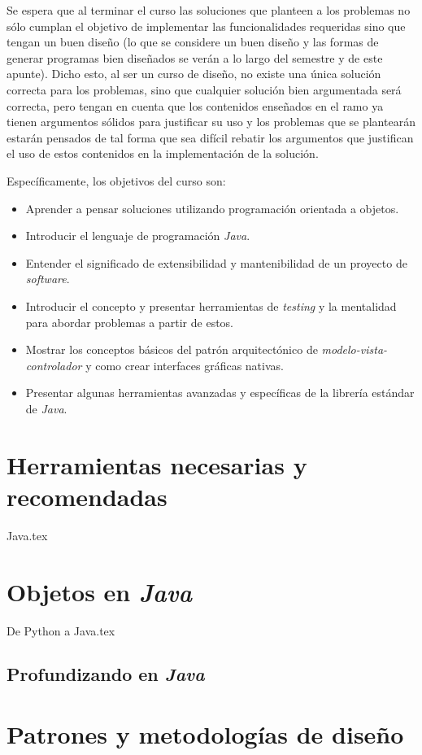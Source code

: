 \documentclass[12pt]{book}
\theoremstyle{definition}
\begin{document}
      Se espera que al terminar el curso las soluciones que planteen a los problemas no
      sólo cumplan el objetivo de implementar las funcionalidades requeridas sino que 
      tengan un buen diseño (lo que se considere un buen diseño y las formas de generar 
      programas bien diseñados se verán a lo largo del semestre y de este apunte).
      Dicho esto, al ser un curso de diseño, no existe una única solución correcta para 
      los problemas, sino que cualquier solución bien argumentada será correcta, pero 
      tengan en cuenta que los contenidos enseñados en el ramo ya tienen argumentos 
      sólidos para justificar su uso y los problemas que se plantearán estarán pensados de
      tal forma que sea difícil rebatir los argumentos que justifican el uso de estos 
      contenidos en la implementación de la solución.

      Específicamente, los objetivos del curso son:

      \begin{itemize}
        \item Aprender a pensar soluciones utilizando programación orientada a objetos.
        \item Introducir el lenguaje de programación \textit{Java}.
        \item Entender el significado de extensibilidad y mantenibilidad de un proyecto de 
          \textit{software}.
        \item Introducir el concepto y presentar herramientas de \textit{testing} y la 
          mentalidad para abordar problemas a partir de estos.
        \item Mostrar los conceptos básicos del patrón arquitectónico de 
          \textit{modelo-vista-controlador} y como crear interfaces gráficas nativas.
        \item Presentar algunas herramientas avanzadas y específicas de la librería 
            estándar de \textit{Java}.
      \end{itemize}

  \mainmatter
  \part{Herramientas necesarias y recomendadas}
    {Java.tex}
    
  \part{Objetos en \textit{Java}}
    
    {De Python a Java.tex}
    \chapter{Profundizando en \textit{Java}}
      \label{ch:java}
  \part{Patrones y metodologías de diseño}
\end{document}
